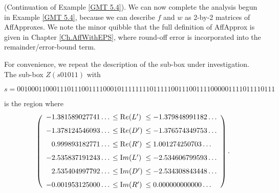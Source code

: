 \begin{example} \label{GMT 6.7} (Continuation of Example \ref{GMT 5.4}).
We can now complete the analysis begun in Example \ref{GMT 5.4},
because we can describe $f$ and $w$ as 2-by-2 matrices of AffApproxes.
We note the minor quibble that the full definition of AffApprox is
	given in Chapter \ref{Ch.AffWithEPS}, where round-off error is incorporated into
the remainder/error-bound term.

For convenience,
we repeat the description of the sub-box under investigation.
The sub-box $Z(s01011)$ with  
\begin{small}
$$s = 001000110001110111001111000101111111101111100111001111000001111011110111$$ 
\end{small}%

\noindent is the region where
$$\left(\begin{array}{rll}
-1.381589027741\ldots &\hskip-6pt \le  {\mathrm Re}(L')&  \hskip-6pt\le  -1.379848991182\ldots\\[7pt]
-1.378124546093\ldots &\hskip-6pt \le  {\mathrm Re}(D')&\hskip-6pt  \le  -1.376574349753\ldots\\[7pt]
0.999893182771\ldots  &\hskip-6pt\le {\mathrm Re}(R')& \hskip-6pt  \le  1.001274250703\ldots\\[7pt]
-2.535837191243\ldots &\hskip-6pt \le  {\mathrm Im}(L')&\hskip-6pt  \le  -2.534606799593\ldots\\[7pt]
2.535404997792\ldots & \hskip-6pt\le  {\mathrm Im}(D') &\hskip-6pt \le  -2.534308843448\ldots\\[7pt]
-0.001953125000\ldots &\hskip-6pt \le {\mathrm  Im}(R')&\hskip-6pt  \le  0.000000000000\ldots
\end{array}\right).$$ 


\end{example}
